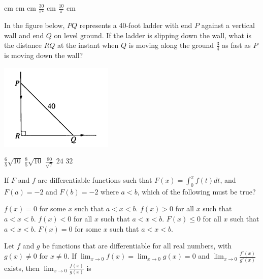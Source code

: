 \begin{questions}
    \begin{oneparchoices}
     cm
     cm
     cm 
    \choice $\frac{30}{\pi^2}$ cm
    \CorrectChoice $\frac{10}{\pi}$ cm
    \end{oneparchoices}

\question[2] In the figure below, $PQ$ represents a 40-foot ladder
    with end $P$ against a vertical wall and end $Q$ on level
    ground. If the ladder is slipping down the wall, what is the
    distance $RQ$ at the instant when $Q$ is moving along the ground
    $\frac{3}{4}$ as fast as $P$ is moving down the wall?

    \begin{center}
        \includegraphics{BC34.png}
    \end{center}

    \begin{oneparchoices}
    \choice $\frac{6}{5}\sqrt{10}$
    \choice $\frac{8}{5}\sqrt{10}$
    \choice $\frac{80}{\sqrt{7}}$
    \choice $24$
    \CorrectChoice $32$
    \end{oneparchoices}

\question[2] If $F$ and $f$ are differentiable functions such that
    $F(x) = \int_0^x f(t)dt$, and $F(a) = -2$ and $F(b) = -2$ where $a
    < b$, which of the following must be true?

    \begin{oneparchoices}
    \CorrectChoice $f(x) = 0$ for some $x$ such that $a < x < b$.
    \choice $f(x) > 0$ for all $x$ such that $a < x < b$.
    \choice $f(x) < 0$ for all $x$ such that $a < x < b$.
    \choice $F(x) \le 0$ for all $x$ such that $a < x < b$.
    \choice $F(x) = 0$ for some $x$ such that $a < x < b$.
    \end{oneparchoices}

\question[2] Let $f$ and $g$ be functions that are differentiable for
    all real numbers, with $g(x) \ne 0$ for $x \ne 0$. If $\lim_{x \to
    0} f(x) = \lim_{x \to 0} g(x) = 0$ and $\lim_{x \to
    0} \frac{f'(x)}{g'(x)}$ exists, then $\lim_{x \to
    0} \frac{f(x)}{g(x)}$ is 


\end{questions}
